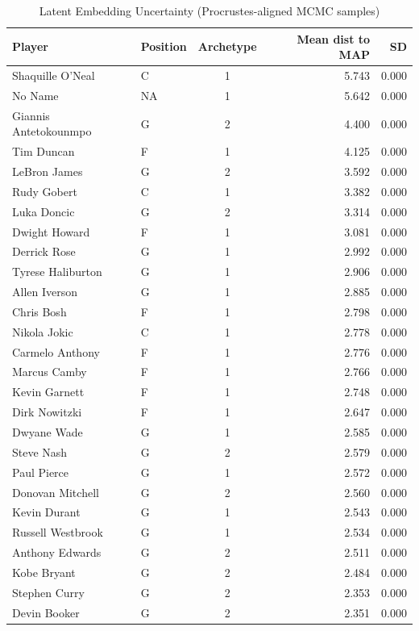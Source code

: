 \begin{table}[t]
\caption*{
{\fontsize{20}{25}\selectfont  Latent Embedding Uncertainty (Procrustes-aligned MCMC samples)\fontsize{12}{15}\selectfont }
} 
\fontsize{12.0pt}{14.0pt}\selectfont
\begin{tabular*}{\linewidth}{@{\extracolsep{\fill}}llcrr}
\toprule
Player & Position & Archetype & Mean dist to MAP & SD \\ 
\midrule\addlinespace[2.5pt]
Shaquille O'Neal & C & 1 & 5.743 & 0.000 \\ 
No Name & NA & 1 & 5.642 & 0.000 \\ 
Giannis Antetokounmpo & G & 2 & 4.400 & 0.000 \\ 
Tim Duncan & F & 1 & 4.125 & 0.000 \\ 
LeBron James & G & 2 & 3.592 & 0.000 \\ 
Rudy Gobert & C & 1 & 3.382 & 0.000 \\ 
Luka Doncic & G & 2 & 3.314 & 0.000 \\ 
Dwight Howard & F & 1 & 3.081 & 0.000 \\ 
Derrick Rose & G & 1 & 2.992 & 0.000 \\ 
Tyrese Haliburton & G & 1 & 2.906 & 0.000 \\ 
Allen Iverson & G & 1 & 2.885 & 0.000 \\ 
Chris Bosh & F & 1 & 2.798 & 0.000 \\ 
Nikola Jokic & C & 1 & 2.778 & 0.000 \\ 
Carmelo Anthony & F & 1 & 2.776 & 0.000 \\ 
Marcus Camby & F & 1 & 2.766 & 0.000 \\ 
Kevin Garnett & F & 1 & 2.748 & 0.000 \\ 
Dirk Nowitzki & F & 1 & 2.647 & 0.000 \\ 
Dwyane Wade & G & 1 & 2.585 & 0.000 \\ 
Steve Nash & G & 2 & 2.579 & 0.000 \\ 
Paul Pierce & G & 1 & 2.572 & 0.000 \\ 
Donovan Mitchell & G & 2 & 2.560 & 0.000 \\ 
Kevin Durant & G & 1 & 2.543 & 0.000 \\ 
Russell Westbrook & G & 1 & 2.534 & 0.000 \\ 
Anthony Edwards & G & 2 & 2.511 & 0.000 \\ 
Kobe Bryant & G & 2 & 2.484 & 0.000 \\ 
Stephen Curry & G & 2 & 2.353 & 0.000 \\ 
Devin Booker & G & 2 & 2.351 & 0.000 \\ 

\end{tabular*}
\end{table}
